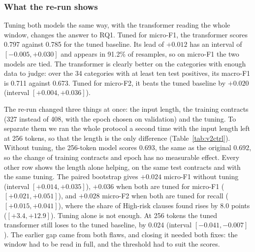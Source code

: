 \subsubsection{What the re-run shows}
Tuning both models the same way, with the transformer reading the whole window, changes the answer to RQ1. Tuned for micro-F1, the transformer scores 0.797 against 0.785 for the tuned baseline. Its lead of $+0.012$ has an interval of $[-0.005, +0.030]$ and appears in 91.2\% of resamples, so on micro-F1 the two models are tied. The transformer is clearly better on the categories with enough data to judge: over the 34 categories with at least ten test positives, its macro-F1 is 0.711 against 0.673. Tuned for micro-F2, it beats the tuned baseline by $+0.020$ (interval $[+0.004, +0.036]$).

The re-run changed three things at once: the input length, the training contracts (327 instead of 408, with the epoch chosen on validation) and the tuning. To separate them we ran the whole protocol a second time with the input length left at 256 tokens, so that the length is the only difference (Table~\ref{tab:v2ctrl}). Without tuning, the 256-token model scores 0.693, the same as the original 0.692, so the change of training contracts and epoch has no measurable effect. Every other row shows the length alone helping, on the same test contracts and with the same tuning. The paired bootstrap gives $+0.024$ micro-F1 without tuning (interval $[+0.014, +0.035]$), $+0.036$ when both are tuned for micro-F1 ($[+0.021, +0.051]$), and $+0.028$ micro-F2 when both are tuned for recall ($[+0.015, +0.041]$), where the share of High-risk clauses found rises by 8.0 points ($[+3.4, +12.9]$). Tuning alone is not enough. At 256 tokens the tuned transformer still loses to the tuned baseline, by 0.024 (interval $[-0.041, -0.007]$). The earlier gap came from both flaws, and closing it needed both fixes: the window had to be read in full, and the threshold had to suit the scores.

